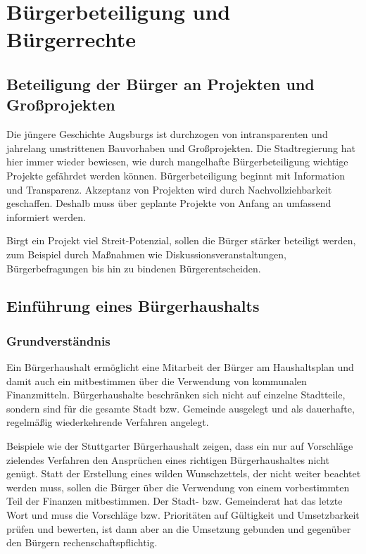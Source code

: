 \chapter{Bürgerbeteiligung und Bürgerrechte}
  
  \section{Beteiligung der Bürger an Projekten und Großprojekten}
  
  Die jüngere Geschichte Augsburgs ist durchzogen von intransparenten und 
  jahrelang umstrittenen Bauvorhaben und Großprojekten. Die Stadtregierung hat 
  hier immer wieder bewiesen, wie durch mangelhafte Bürgerbeteiligung wichtige 
  Projekte gefährdet werden können. Bürgerbeteiligung beginnt mit Information 
  und Transparenz. Akzeptanz von Projekten wird durch Nachvollziehbarkeit 
  geschaffen. Deshalb muss über geplante Projekte von Anfang an umfassend 
  informiert werden.
  
  Birgt ein Projekt viel Streit-Potenzial, sollen die Bürger stärker beteiligt 
  werden, zum Beispiel durch Maßnahmen wie Diskussionsveranstaltungen, 
  Bürgerbefragungen bis hin zu bindenen Bürgerentscheiden.
  
  \pagebreak
  \section{Einführung eines Bürgerhaushalts}

  \subsection{Grundverständnis}
  
  Ein Bürgerhaushalt ermöglicht eine Mitarbeit der Bürger am Haushaltsplan und 
  damit auch ein mitbestimmen über die Verwendung von kommunalen 
  Finanzmitteln. Bürgerhaushalte beschränken sich nicht auf einzelne 
  Stadtteile, sondern sind für die gesamte Stadt bzw. Gemeinde ausgelegt und 
  als dauerhafte, regelmäßig wiederkehrende Verfahren angelegt.
  
  Beispiele wie der Stuttgarter Bürgerhaushalt zeigen, dass ein nur auf 
  Vorschläge zielendes Verfahren den Ansprüchen eines richtigen 
  Bürgerhaushaltes nicht genügt. Statt der Erstellung eines wilden 
  Wunschzettels, der nicht weiter beachtet werden muss, sollen die Bürger über 
  die Verwendung von einem vorbestimmten Teil der Finanzen mitbestimmen. Der 
  Stadt- bzw. Gemeinderat hat das letzte Wort und muss die Vorschläge bzw. 
  Prioritäten auf Gültigkeit und Umsetzbarkeit prüfen und bewerten, ist dann 
  aber an die Umsetzung gebunden und gegenüber den Bürgern 
  rechenschaftspflichtig.
  
